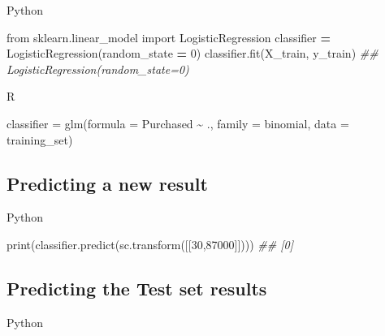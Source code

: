 \documentclass[
]{book}
\newenvironment{Shaded}{\begin{snugshade}}{\end{snugshade}}
\newcommand{\AttributeTok}[1]{\textcolor[rgb]{0.77,0.63,0.00}{#1}}
\newcommand{\BuiltInTok}[1]{#1}
\newcommand{\CommentTok}[1]{\textcolor[rgb]{0.56,0.35,0.01}{\textit{#1}}}
\newcommand{\DecValTok}[1]{\textcolor[rgb]{0.00,0.00,0.81}{#1}}
\newcommand{\FunctionTok}[1]{\textcolor[rgb]{0.00,0.00,0.00}{#1}}
\newcommand{\ImportTok}[1]{#1}
\newcommand{\NormalTok}[1]{#1}
\newcommand{\OperatorTok}[1]{\textcolor[rgb]{0.81,0.36,0.00}{\textbf{#1}}}
\newcommand{\OtherTok}[1]{\textcolor[rgb]{0.56,0.35,0.01}{#1}}
\newcommand{\SpecialCharTok}[1]{\textcolor[rgb]{0.00,0.00,0.00}{#1}}
\theoremstyle{definition}
\theoremstyle{definition}
\theoremstyle{definition}
\theoremstyle{definition}
\theoremstyle{remark}
\begin{document}
Python

\begin{Shaded}
\begin{Highlighting}[]
\ImportTok{from}\NormalTok{ sklearn.linear\_model }\ImportTok{import}\NormalTok{ LogisticRegression}
\NormalTok{classifier }\OperatorTok{=}\NormalTok{ LogisticRegression(random\_state }\OperatorTok{=} \DecValTok{0}\NormalTok{)}
\NormalTok{classifier.fit(X\_train, y\_train)}
\CommentTok{\#\# LogisticRegression(random\_state=0)}
\end{Highlighting}
\end{Shaded}

R

\begin{Shaded}
\begin{Highlighting}[]
\NormalTok{classifier }\OtherTok{=} \FunctionTok{glm}\NormalTok{(}\AttributeTok{formula =}\NormalTok{ Purchased }\SpecialCharTok{\textasciitilde{}}\NormalTok{ .,}
                 \AttributeTok{family =}\NormalTok{ binomial,}
                 \AttributeTok{data =}\NormalTok{ training\_set)}
\end{Highlighting}
\end{Shaded}

\hypertarget{predicting-a-new-result-3}{%
\subsection{Predicting a new result}\label{predicting-a-new-result-3}}

Python

\begin{Shaded}
\begin{Highlighting}[]
\BuiltInTok{print}\NormalTok{(classifier.predict(sc.transform([[}\DecValTok{30}\NormalTok{,}\DecValTok{87000}\NormalTok{]])))}
\CommentTok{\#\# [0]}
\end{Highlighting}
\end{Shaded}

\hypertarget{predicting-the-test-set-results-2}{%
\subsection{Predicting the Test set results}\label{predicting-the-test-set-results-2}}

Python
\end{document}
